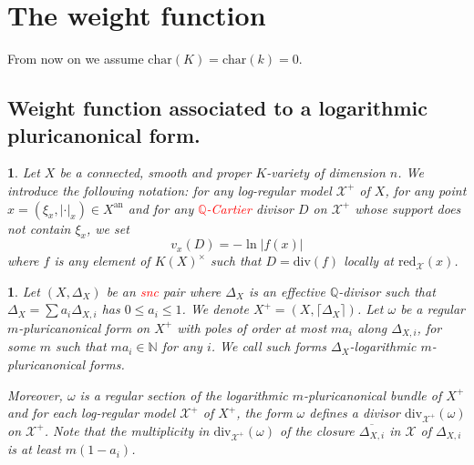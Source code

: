 \documentclass{amsart}%
\numberwithin{equation}{subsection}
\theoremstyle{plain2}
\theoremstyle{definition2}
\theoremstyle{stepstyle}
\theoremstyle{point}
\theoremstyle{subpoint}
\newtheorem{subpoint}[equation]{}%
\newcommand{\spa}[1]{\begin{subpoint}#1\end{subpoint}}           %
\newcommand{\N}{\ensuremath{\mathbb{N}}}
\newcommand{\Q}{\ensuremath{\mathbb{Q}}}
\newcommand{\cX}{\ensuremath{\mathscr{X}}}
\newcommand{\redu}{\mathrm{red}}
\newcommand{\an}{\mathrm{an}}
\newcommand{\divisor}{\mathrm{div}}
\begin{document}
\section{The weight function}\label{sec weight}
From now on we assume $\text{char}(K)=\text{char}(k)=0$.
\subsection{Weight function associated to a logarithmic pluricanonical form.}
\spa{Let $X$ be a connected, smooth and proper $K$-variety of dimension $n$. We introduce the following notation: for any log-regular model $\cX^+$ of $X$, for any point $x = (\xi_x,|\cdot|_x) \in X^\an$ and for any \textcolor{red}{$\Q$-Cartier} divisor $D$ on $\cX^+$ whose support does not contain $\xi_x$, we set $$v_x(D) = - \ln |f(x)|$$ where $f$ is any element of $K(X)^\times$ such that $D= \divisor(f)$ locally at $\redu_{\cX}(x)$.}

\spa{Let $(X,\Delta_X)$ be an \textcolor{red}{snc} pair where $\Delta_X$ is an effective $\Q$-divisor such that $\Delta_X= \sum a_i \Delta_{X,i}$ has $0 \leqslant a_i \leqslant 1$. We denote $X^+=(X,\lceil \Delta_X \rceil)$. Let $\omega$ be a regular $m$-pluricanonical form on $X^+$ with poles of order at most $ma_i$ along $\Delta_{X,i}$, for some $m$ such that $ma_i \in \N$ for any $i$. We call such forms $\Delta_X$-logarithmic $m$-pluricanonical forms.

Moreover, $\omega$ is a regular section of the logarithmic $m$-pluricanonical bundle of $X^+$ and for each log-regular model $\cX^+$ of $X^+$, the form $\omega$ defines a divisor $\divisor_{\cX^+}(\omega)$ on $\cX^+$. Note that the multiplicity in $\divisor_{\cX^+}(\omega)$ of the closure $\overline{\Delta_{X,i}}$ in $\cX$ of $\Delta_{X,i}$ is at least $m(1-a_i)$.
}
\end{document}
